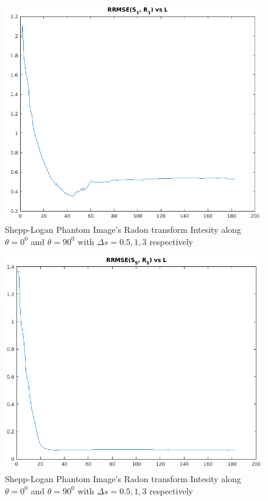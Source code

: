 \documentclass[11pt]{article}
\begin{document}
\begin{figure}[h]
\centering
\includegraphics[scale=0.4]{RRMSE1}
\caption{Shepp-Logan Phantom Image's Radon transform Intesity along $\theta=0^{0} $ and $\theta=90^{0} $ with $\Delta s = 0.5,1,3$ respectively}
\end{figure}
\begin{figure}[h]
\centering
\includegraphics[scale=0.4]{RRMSE5}
\caption{Shepp-Logan Phantom Image's Radon transform Intesity along $\theta=0^{0} $ and $\theta=90^{0} $ with $\Delta s = 0.5,1,3$ respectively}
\end{figure}
\end{document}

